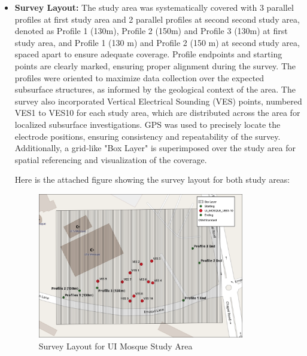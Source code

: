 \documentclass[12pt,a4paper]{report}
\begin{document}
\begin{itemize}
    \item \textbf{Survey Layout:}  
    The study area was systematically covered with 3 parallel profiles at first study area and 2 parallel profiles at second second study area, denoted as Profile 1 (130m), Profile 2 (150m) and Profile 3 (130m) at first study area, and  Profile 1 (130 m) and Profile 2 (150 m) at second study area, spaced apart to ensure adequate coverage. Profile endpoints and starting points are clearly marked, ensuring proper alignment during the survey. The profiles were oriented to maximize data collection over the expected subsurface structures, as informed by the geological context of the area. The survey also incorporated Vertical Electrical Sounding (VES) points, numbered VES1 to VES10 for each study area, which are distributed across the area for localized subsurface investigations. GPS was used to precisely locate the electrode positions, ensuring consistency and repeatability of the survey. Additionally, a grid-like "Box Layer" is superimposed over the study area for spatial referencing and visualization of the coverage.
    
    Here is the attached figure showing the survey layout for both study areas:
    
    \begin{figure}[H]
        \centering
        \includegraphics[width=0.85\textwidth]{Mosque_Survey_Layout.png}
        \caption{Survey Layout for UI Mosque Study Area}
        \label{fig:UI Mosque Survey Layout}
    \end{figure}


\end{itemize}
\end{document}
